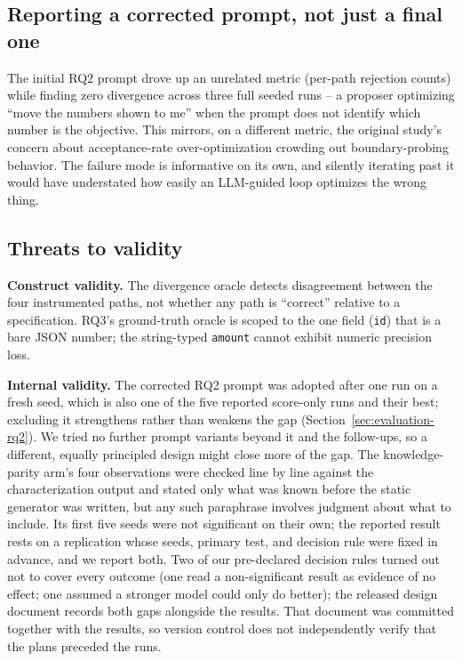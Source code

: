 \subsection{Reporting a corrected prompt, not just a final one}
The initial RQ2 prompt drove up an unrelated metric (per-path rejection
counts) while finding zero divergence across three full seeded runs -- a
proposer optimizing ``move the numbers shown to me'' when the prompt does
not identify which number is the objective. This mirrors, on a different
metric, the original study's concern about acceptance-rate
over-optimization crowding out boundary-probing behavior. The failure mode
is informative on its own, and silently iterating past it would have
understated how easily an LLM-guided loop optimizes the wrong thing.

\subsection{Threats to validity}
\textbf{Construct validity.} The divergence oracle detects disagreement
between the four instrumented paths, not whether any path is ``correct''
relative to a specification. RQ3's ground-truth oracle is scoped to the one
field (\texttt{id}) that is a bare JSON number; the string-typed
\texttt{amount} cannot exhibit numeric precision loss.

\textbf{Internal validity.} The corrected RQ2 prompt was adopted after one
run on a fresh seed, which is also one of the five reported score-only runs
and their best; excluding it strengthens rather than weakens the gap
(Section~\ref{sec:evaluation-rq2}). We tried no further prompt variants beyond it and the
follow-ups, so a different, equally principled design might close more of
the gap. The knowledge-parity arm's four observations were checked line by
line against the characterization output and stated only what was known
before the static generator was written, but any such paraphrase involves
judgment about what to include. Its first five seeds were not significant on
their own; the reported result rests on a replication whose seeds, primary
test, and decision rule were fixed in advance, and we report both. Two of our
pre-declared decision rules turned out not to cover every outcome (one read
a non-significant result as evidence of no effect; one assumed a stronger
model could only do better); the released design document records both gaps
alongside the results. That document was committed together with the
results, so version control does not independently verify that the plans
preceded the runs.

